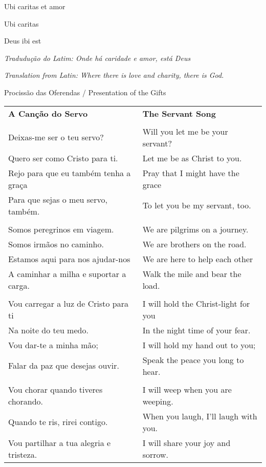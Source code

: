Ubi caritas et amor

Ubi caritas

Deus ibi est

\vspace{5pt}

{\it Tradudução do Latim: Onde há caridade e amor, está Deus}

{\it Translation from Latin: Where there is love and charity, there is God.}


\newpage
{\large Procissão das Oferendas / Presentation of the Gifts}

\begin{longtable}{p{2.1in}p{2in}}
\textbf{A Canção do Servo} & \textbf{The Servant Song}\\
\\
Deixas-me ser o teu servo? & Will you let me be your servant?\\
Quero ser como Cristo para ti. & Let me be as Christ to you.\\
Rejo para que eu também tenha a graça & Pray that I might have the grace\\
Para que sejas o meu servo, também. & To let you be my servant, too.\\
\\
Somos peregrinos em viagem. & We are pilgrims on a journey.\\
Somos irmãos no caminho. & We are brothers on the road.\\
Estamos aqui para nos ajudar-nos & We are here to help each other\\
A caminhar a milha e suportar a carga. & Walk the mile and bear the load.\\
\\
Vou carregar a luz de Cristo para ti & I will hold the Christ-light for you\\
Na noite do teu medo. & In the night time of your fear.\\
Vou dar-te a minha mão; & I will hold my hand out to you;\\
Falar da paz que desejas ouvir. & Speak the peace you long to hear.\\
\\
Vou chorar quando tiveres chorando. & I will weep when you are weeping.\\
Quando te ris, rirei contigo. & When you laugh, I'll laugh with you.\\
Vou partilhar a tua alegria e tristeza. & I will share your joy and sorrow.\\

\end{longtable}

